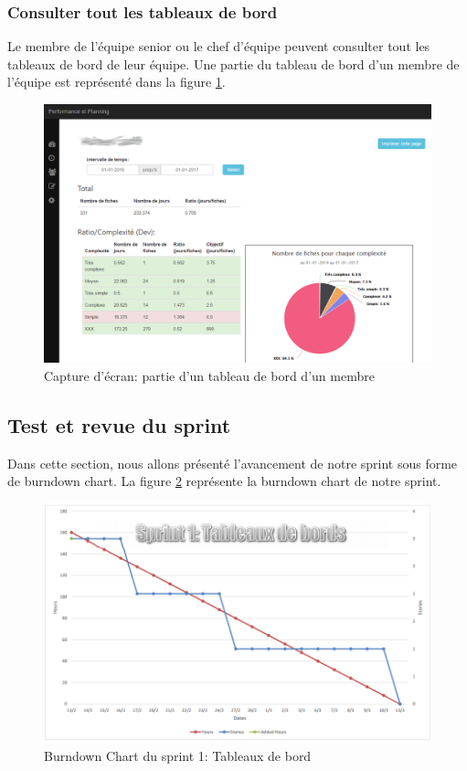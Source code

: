 \subsubsection{Consulter tout les tableaux de bord}
Le membre de l'équipe senior ou le chef d'équipe peuvent consulter tout les tableaux de bord de leur équipe. Une partie du tableau de bord d'un membre de l'équipe est représenté dans la figure \ref{code85}.
\begin{figure}[H]
  \centering
 \includegraphics[scale=0.35]{figures/printscreen_app/3_1.PNG}
 \caption{Capture d'écran: partie d'un tableau de bord d'un membre}
 \label{code85}
\end{figure}

\subsection{Test et revue du sprint}
Dans cette section, nous allons présenté l'avancement de notre sprint sous forme de burndown chart. La figure \ref{code86} représente la burndown chart de notre sprint.
\begin{figure}[H]
  \centering
 \includegraphics[scale=0.7]{figures/burndown_chart/sprint1.png}
 \caption{Burndown Chart du sprint 1: Tableaux de bord}
 \label{code86}
\end{figure}

